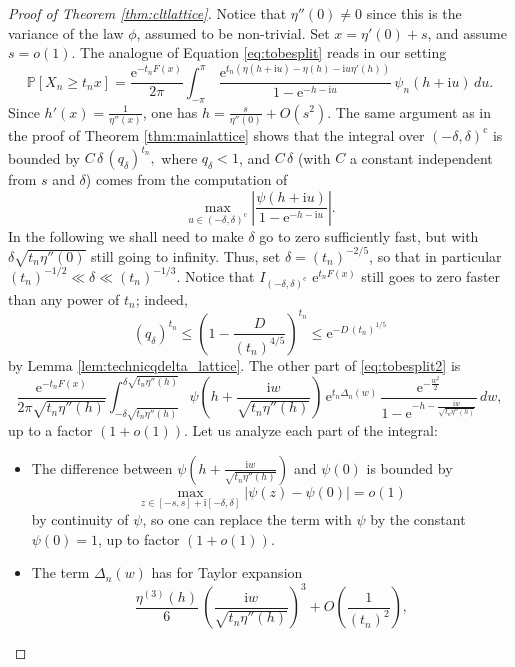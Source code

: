 \documentclass[12pt,a4paper,reqno]{amsart}
\theoremstyle{remark}
\newcommand{\E}{\mathrm{e}}
\newcommand{\I}{\mathrm{i}}
\newcommand{\proba}{\mathbb{P}}
\begin{document}
\begin{proof}[Proof of Theorem \ref{thm:cltlattice}]
Notice that $\eta''(0)\neq 0$ since this is the variance of the law $\phi$, 
assumed to be non-trivial.
Set $x=\eta'(0)+s$, and assume $s =o(1)$. The analogue of Equation \eqref{eq:tobesplit} reads in our setting
\begin{equation}\proba[X_{n}\geq t_{n}x]=\frac{ \E^{-t_{n}F(x)}}{2\pi}\int_{-\pi}^{\pi}\,\frac{\E^{t_{n}(\eta(h+\I u) - \eta(h)- \I u \eta'(h))}}{1-\E^{-h-\I u}}\,\psi_{n}(h + \I u)\,du.\label{eq:tobesplit2}\end{equation}
Since $h'(x)=\frac{1}{\eta''(x)}$, one has $h=\frac{s}{\eta''(0)}+O(s^{2})$.
The same argument as in the proof of Theorem \ref{thm:mainlattice} shows that the integral over $(-\delta,\delta)^{\mathrm{c}}$ is bounded by $C\,\delta\,(q_{\delta})^{t_{n}},$ where $q_{\delta} <1$, and $C\,\delta$ (with $C$ a constant independent from $s$ and $\delta$) comes from the computation of 
$$\max_{u \in (-\delta,\delta)^{\mathrm{c}}}\left|\frac{\psi(h+\I u)}{1-\E^{-h-\I u}}\right|.$$
In the following we shall need to make $\delta$ go to zero sufficiently fast, but with $\delta\sqrt{t_{n}\eta''(0)}$ still going to infinity. Thus, set $\delta=(t_{n})^{-2/5}$, so that in particular $(t_{n})^{-1/2}\ll \delta \ll (t_{n})^{-1/3}$.
Notice that $I_{(-\delta,\delta)^\mathrm{c}}\,\,\E^{t_{n}F(x)}$ still goes to zero faster than any power of $t_{n}$; indeed, 
$$(q_{\delta})^{t_{n}}\leq \left(1-\frac{D}{(t_{n})^{4/5}}\right)^{t_{n}} \leq \E^{-D\,(t_{n})^{1/5}}$$
by Lemma \ref{lem:technicqdelta_lattice}. The other part of \eqref{eq:tobesplit2} is 
$$\frac{\E^{-t_{n}F(x)}}{2\pi \sqrt{t_{n}\eta''(h)}}\int_{-\delta \sqrt{t_{n}\eta''(h)}}^{\delta  \sqrt{t_{n}\eta''(h)}} \psi\!\left(h+\frac{\I w}{ \sqrt{t_{n}\eta''(h)}}\right) \,\E^{t_{n}\Delta_n(w)}\,\frac{\E^{-\frac{w^{2}}{2}}}{1-\E^{-h-\frac{\I w}{\sqrt{t_{n}\eta''(h)}}}}\,dw,$$
up to a factor $(1+o(1))$. Let us analyze each part of the integral:\vspace{2mm}
\begin{itemize}
\item The difference between $\psi\left(h+\frac{\I w}{ \sqrt{t_{n}\eta''(h)}}\right)$ and $\psi(0)$ is bounded by
$$\max_{z \in [-s,s]+\I[-\delta,\delta]}|\psi(z)-\psi(0)|=o(1)$$
by continuity of $\psi$, so one can replace the term with $\psi$ by the constant $\psi(0)=1$, up to factor $(1+o(1))$.\vspace{2mm}
\item The term $\Delta_n(w)$ has for Taylor expansion
$$\frac{\eta^{(3)}(h)}{6}\,\left(\frac{\I w}{\sqrt{t_{n}\eta''(h)}}\right)^{\!3}+O\left(\frac{1}{(t_{n})^{2}}\right),$$

\end{itemize}
\end{proof}
\end{document}
